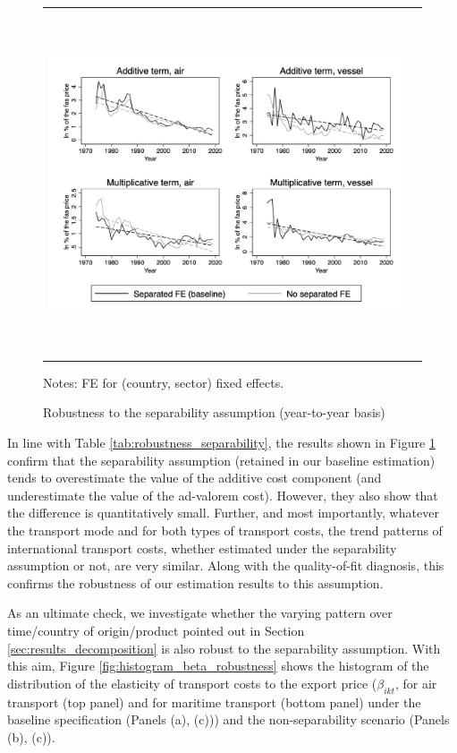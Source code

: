 \documentclass[a4paper,11pt]{article}
\begin{document}
\begin{figure}[htbp]
\caption{Robustness to the separability assumption (year-to-year basis)}
\label{fig:robustesse_non_separe}
\begin{center}
\begin{tabular}{cc}
\includegraphics[width=6in, height=4in]{graph_robustesse_ns.jpg}

\end{tabular}
\end{center}
\begin{minipage} [c]  {5in} \scriptsize%
Notes: FE for (country, sector) fixed effects.
\end{minipage}
\end{figure}

In line with Table \ref{tab:robustness_separability}, the results shown in Figure \ref{fig:robustesse_non_separe} confirm that the separability assumption (retained in our baseline estimation) tends to overestimate the value of the additive cost component (and underestimate the value of the ad-valorem cost).
However, they also show that the difference is quantitatively small. Further, and most importantly, whatever the transport mode and for both types of transport costs, the trend patterns of international transport costs, whether estimated under the separability assumption or not, are very similar. Along with the quality-of-fit diagnosis, this confirms the robustness of our estimation results to this assumption.

As an ultimate check, we investigate whether the varying pattern over time/country of origin/product pointed out in Section \ref{sec:results_decomposition} is also robust to the separability assumption. With this aim, Figure \ref{fig:histogram_beta_robustness} shows the histogram of the distribution of the elasticity of transport costs to the export price ($\beta_{ikt}$, for air transport (top panel) and for maritime transport (bottom panel) under the baseline specification (Panels (a), (c))) and the non-separability scenario (Panels (b), (c)).
\end{document}
